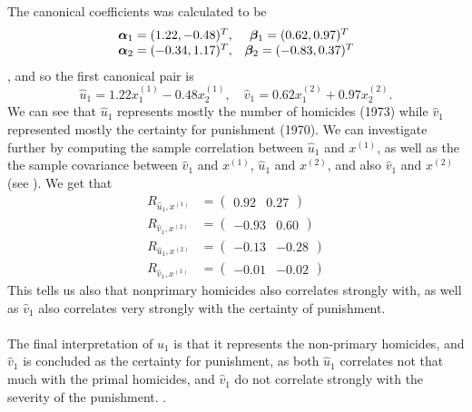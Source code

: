 The canonical coefficients  was calculated to be
\begin{align*}
  \begin{matrix}
     \bm{\alpha}_{1} =  (1.22,   -0.48)^{T},  & \bm{\beta}_{1} =  (0.62,0.97)^{T} \\
  \bm{\alpha}_{2} =  (-0.34, 1.17)^{T},  & \bm{\beta}_{2} = (-0.83, 0.37)^{T}
  \end{matrix}
\end{align*}, 
and so the first canonical pair is
\begin{equation*}
  \hat u_1 = 1.22 x_{1}^{(1)} - 0.48 x_{2}^{(1)} , \quad \hat v_{1} =
  0.62 x_{1}^{(2)} + 0.97 x_{2}^{(2)}. 
\end{equation*}
We can see that $\hat u_{1}$ represents mostly the number of homicides
 (1973) while $\hat v_{1}$ represented mostly the certainty for
 punishment (1970). We can investigate further by computing the sample
 correlation between $\hat u_{1}$ and $x^{(1)}$, as well as the the
 sample covariance between $\hat v_{1}$ and $x^{(1)}$, $\hat u_{1}$ and
 $x^{(2)}$, and also $\hat v_{1}$ and  $x^{(2)}$ (see \cite[p. 552]{book}). We get that
 \begin{align*}
   R_{\hat u_{1}, x^{(1)}} &= \begin{pmatrix}0.92 &0.27   \end{pmatrix} \\
   R_{\hat v_{1}, x^{(2)}} &= \begin{pmatrix}-0.93 &0.60   \end{pmatrix} \\
   R_{\hat u_{1}, x^{(2)}} &= \begin{pmatrix}-0.13 &-0.28 \end{pmatrix} \\   
   R_{\hat v_{1}, x^{(1)}} &= \begin{pmatrix}-0.01 &-0.02   \end{pmatrix} 
 \end{align*}
This tells us also that nonprimary homicides also correlates strongly
with, as well as $\hat v_{1}$ also correlates very strongly with the
certainty of punishment.\\
\\
The final interpretation of $\hat u_{1}$ is that it represents the
non-primary homicides, and $\hat v_{1}$ is concluded as the certainty
for punishment, as both $\hat u_{1}$ correlates not that much with the
primal homicides, and $\hat v_{1}$ do not correlate strongly with the
severity of the punishment. . 



